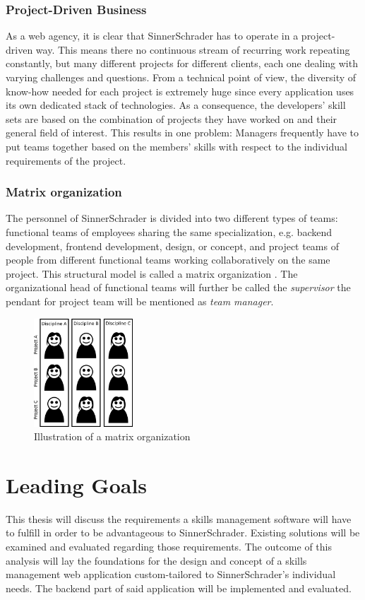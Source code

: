 \subsubsection{Project-Driven Business}
As a web agency, it is clear that SinnerSchrader has to operate in a project-driven way. This means there no continuous stream of recurring work repeating constantly, but many different projects for different clients, each one dealing with varying challenges and questions. From a technical point of view, the diversity of know-how needed for each project is extremely huge since every application uses its own dedicated stack of technologies. As a consequence, the developers’ skill sets are based on the combination of projects they have worked on and their general field of interest. This results in one problem: Managers frequently have to put teams together based on the members’ skills with respect to the individual requirements of the project.

\subsubsection{Matrix organization}
The personnel of SinnerSchrader is divided into two different types of teams: functional teams of
employees sharing the same specialization, e.g. backend development, frontend development, design, or concept, and project teams of people from different functional teams working collaboratively on the same project. This structural model is called a matrix organization \cite[P. 75]{BWL}.
The organizational head of functional teams will further be called the \textit{supervisor} the pendant for project team will be mentioned as \textit{team manager}.

\begin{figure}[!htp]
    \centering
    \includegraphics[width=0.33\textwidth]{images/matrixorga.png}
    \caption[Matrix organization]{Illustration of a matrix organization}
    \label{fig:matrixorga}
\end{figure}



\section{Leading Goals}
This thesis will discuss the requirements a skills management software will have to fulfill in order to be advantageous to SinnerSchrader. Existing solutions will be examined and evaluated regarding those requirements. The outcome of this analysis will lay the foundations for the design and concept of a skills management web application custom-tailored to SinnerSchrader's individual needs. The backend part of said application will be implemented and evaluated.
